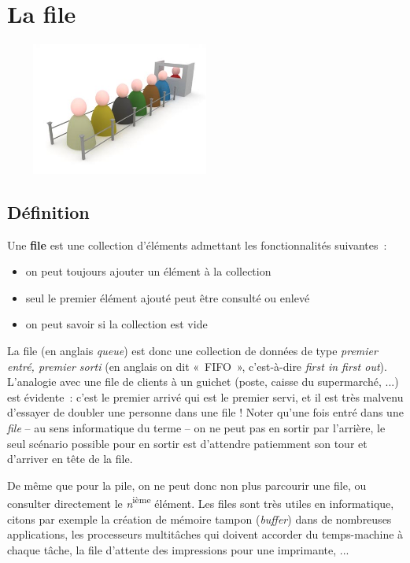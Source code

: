 \chapter{La file}

\begin{center}
	\includegraphics[width=7.553cm,height=4.357cm]{image/a2012Logique2eme-img013.jpg}
\end{center}
	

\section{Définition}
	
	Une \textbf{file} est une collection d'éléments 
	admettant les fonctionnalités suivantes~:

	\begin{itemize}
		\item {
			on peut toujours ajouter un élément à la collection}
		\item {
			seul le premier élément ajouté peut être consulté ou enlevé}
		\item {
			on peut savoir si la collection est vide}
	\end{itemize}

	La file (en anglais \textit{queue}) est donc une collection 
	de données de type \textit{premier entré, premier sorti} 
	(en anglais on dit «~FIFO~», c'est-à-dire \textit{first in first out}). 
	L'analogie avec une file de clients à un guichet (poste, caisse du 
	supermarché, ...) est évidente~: c'est le premier arrivé qui est 
	le premier servi, et il est très malvenu d'essayer de doubler une personne 
	dans une file ! Noter qu'une fois entré dans une \textit{file} -- au
	sens informatique du terme -- on ne peut pas en sortir par l'arrière, 
	le seul scénario possible pour en sortir est
	d'attendre patiemment son tour et d'arriver en tête de la file.

	De même que pour la pile, on ne peut donc non plus parcourir une 
	file, ou consulter directement le \textit{n}\textsuperscript{ième}
	élément. Les files sont très utiles en informatique, citons par 
	exemple la création de mémoire tampon (\textit{buffer})
	dans de nombreuses applications, les processeurs multitâches 
	qui doivent accorder du temps-machine à chaque tâche, la
	file d'attente des impressions pour une imprimante, ...

